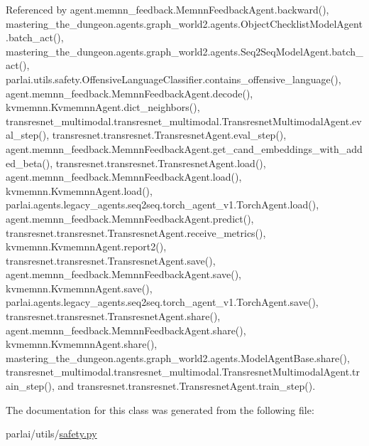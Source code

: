 Referenced by agent.\+memnn\+\_\+feedback.\+Memnn\+Feedback\+Agent.\+backward(), mastering\+\_\+the\+\_\+dungeon.\+agents.\+graph\+\_\+world2.\+agents.\+Object\+Checklist\+Model\+Agent.\+batch\+\_\+act(), mastering\+\_\+the\+\_\+dungeon.\+agents.\+graph\+\_\+world2.\+agents.\+Seq2\+Seq\+Model\+Agent.\+batch\+\_\+act(), parlai.\+utils.\+safety.\+Offensive\+Language\+Classifier.\+contains\+\_\+offensive\+\_\+language(), agent.\+memnn\+\_\+feedback.\+Memnn\+Feedback\+Agent.\+decode(), kvmemnn.\+Kvmemnn\+Agent.\+dict\+\_\+neighbors(), transresnet\+\_\+multimodal.\+transresnet\+\_\+multimodal.\+Transresnet\+Multimodal\+Agent.\+eval\+\_\+step(), transresnet.\+transresnet.\+Transresnet\+Agent.\+eval\+\_\+step(), agent.\+memnn\+\_\+feedback.\+Memnn\+Feedback\+Agent.\+get\+\_\+cand\+\_\+embeddings\+\_\+with\+\_\+added\+\_\+beta(), transresnet.\+transresnet.\+Transresnet\+Agent.\+load(), agent.\+memnn\+\_\+feedback.\+Memnn\+Feedback\+Agent.\+load(), kvmemnn.\+Kvmemnn\+Agent.\+load(), parlai.\+agents.\+legacy\+\_\+agents.\+seq2seq.\+torch\+\_\+agent\+\_\+v1.\+Torch\+Agent.\+load(), agent.\+memnn\+\_\+feedback.\+Memnn\+Feedback\+Agent.\+predict(), transresnet.\+transresnet.\+Transresnet\+Agent.\+receive\+\_\+metrics(), kvmemnn.\+Kvmemnn\+Agent.\+report2(), transresnet.\+transresnet.\+Transresnet\+Agent.\+save(), agent.\+memnn\+\_\+feedback.\+Memnn\+Feedback\+Agent.\+save(), kvmemnn.\+Kvmemnn\+Agent.\+save(), parlai.\+agents.\+legacy\+\_\+agents.\+seq2seq.\+torch\+\_\+agent\+\_\+v1.\+Torch\+Agent.\+save(), transresnet.\+transresnet.\+Transresnet\+Agent.\+share(), agent.\+memnn\+\_\+feedback.\+Memnn\+Feedback\+Agent.\+share(), kvmemnn.\+Kvmemnn\+Agent.\+share(), mastering\+\_\+the\+\_\+dungeon.\+agents.\+graph\+\_\+world2.\+agents.\+Model\+Agent\+Base.\+share(), transresnet\+\_\+multimodal.\+transresnet\+\_\+multimodal.\+Transresnet\+Multimodal\+Agent.\+train\+\_\+step(), and transresnet.\+transresnet.\+Transresnet\+Agent.\+train\+\_\+step().



The documentation for this class was generated from the following file\+:\begin{DoxyCompactItemize}
\item 
parlai/utils/\hyperlink{safety_8py}{safety.\+py}\end{DoxyCompactItemize}

